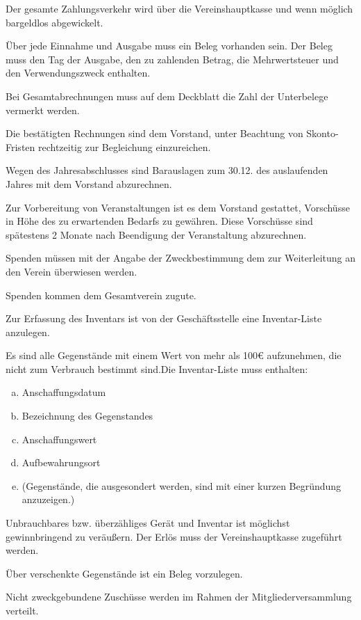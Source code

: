\begin{finanz}
  \label{zahlungsverkehr}

  Der gesamte Zahlungsverkehr wird über die Vereinshauptkasse und wenn möglich bargeldlos abgewickelt.

  Über jede Einnahme und Ausgabe muss ein Beleg vorhanden sein. Der Beleg muss den Tag der Ausgabe, den zu zahlenden Betrag, die Mehrwertsteuer und den Verwendungszweck enthalten.

  Bei Gesamtabrechnungen muss auf dem Deckblatt die Zahl der Unterbelege vermerkt werden.

  Die bestätigten Rechnungen sind dem Vorstand, unter Beachtung von Skonto-Fristen rechtzeitig zur Begleichung einzureichen.

  Wegen des Jahresabschlusses sind Barauslagen zum 30.12. des auslaufenden Jahres mit dem Vorstand abzurechnen.

  Zur Vorbereitung von Veranstaltungen ist es dem Vorstand gestattet, Vorschüsse in Höhe des zu erwartenden Bedarfs zu gewähren. Diese Vorschüsse sind spätestens 2 Monate nach Beendigung der Veranstaltung abzurechnen.


  Spenden müssen mit der Angabe der Zweckbestimmung dem \name zur Weiterleitung an den Verein überwiesen werden.

  Spenden kommen dem Gesamtverein zugute.


  Zur Erfassung des Inventars ist von der Geschäftsstelle eine Inventar-Liste anzulegen.

  Es sind alle Gegenstände mit einem Wert von mehr als 100\euro{} aufzunehmen, die nicht zum Verbrauch bestimmt sind.Die Inventar-Liste muss enthalten:
  \begin{enumerate}[(a)]
    \item Anschaffungsdatum
    \item Bezeichnung des Gegenstandes
    \item Anschaffungswert
    \item Aufbewahrungsort
    \item (Gegenstände, die ausgesondert werden, sind mit einer kurzen Begründung anzuzeigen.)
  \end{enumerate}

  Unbrauchbares bzw. überzähliges Gerät und Inventar ist möglichst gewinnbringend zu veräußern. Der Erlös muss der Vereinshauptkasse zugeführt werden.

  Über verschenkte Gegenstände ist ein Beleg vorzulegen.


  Nicht zweckgebundene Zuschüsse werden im Rahmen der Mitgliederversammlung verteilt.

\end{finanz}



